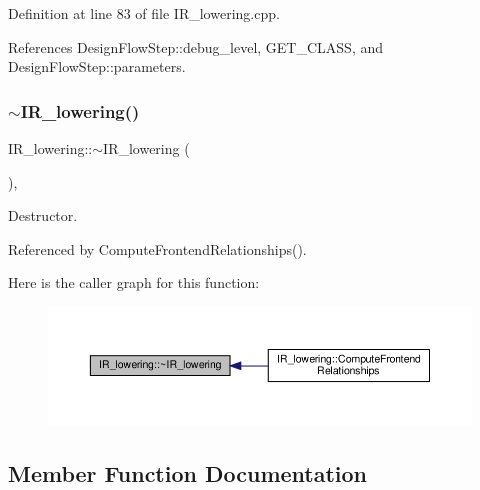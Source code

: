 Definition at line 83 of file I\+R\+\_\+lowering.\+cpp.



References Design\+Flow\+Step\+::debug\+\_\+level, G\+E\+T\+\_\+\+C\+L\+A\+SS, and Design\+Flow\+Step\+::parameters.

\mbox{\label{classIR__lowering_a714d425fd2cb725e5cc9ec803410b510}} 
\subsubsection{\texorpdfstring{$\sim$\+I\+R\+\_\+lowering()}{~IR\_lowering()}}
{\footnotesize\ttfamily I\+R\+\_\+lowering\+::$\sim$\+I\+R\+\_\+lowering (\begin{DoxyParamCaption}{ }\end{DoxyParamCaption})\hspace{0.3cm}{\ttfamily [override]}, {\ttfamily [default]}}



Destructor. 



Referenced by Compute\+Frontend\+Relationships().

Here is the caller graph for this function\+:
\nopagebreak
\begin{figure}[H]
\begin{center}
\leavevmode
\includegraphics[width=350pt]{df/d7d/classIR__lowering_a714d425fd2cb725e5cc9ec803410b510_icgraph}
\end{center}
\end{figure}


\subsection{Member Function Documentation}
\mbox{\label{classIR__lowering_adaba1afb2ed746864d7e0bc9d2b1c25d}} 
